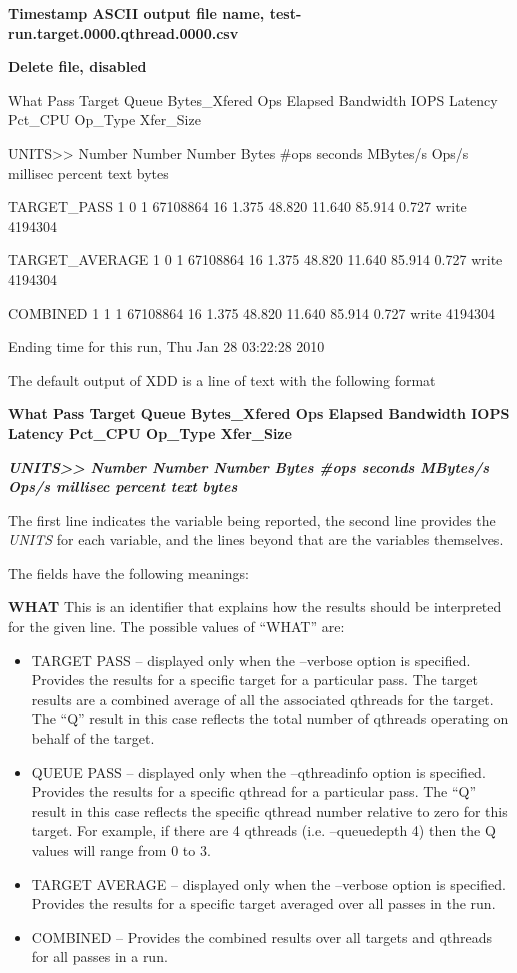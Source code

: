 \textbf{Timestamp ASCII output file name, test-run.target.0000.qthread.0000.csv}

\textbf{Delete file, disabled}

What Pass Target Queue Bytes\_Xfered Ops Elapsed Bandwidth IOPS Latency Pct\_CPU Op\_Type Xfer\_Size

UNITS\textgreater\textgreater{} Number Number Number Bytes \#ops seconds MBytes/s Ops/s millisec percent text bytes

TARGET\_PASS 1 0 1 67108864 16 1.375 48.820 11.640 85.914 0.727 write 4194304

TARGET\_AVERAGE 1 0 1 67108864 16 1.375 48.820 11.640 85.914 0.727 write 4194304

COMBINED 1 1 1 67108864 16 1.375 48.820 11.640 85.914 0.727 write 4194304

Ending time for this run, Thu Jan 28 03:22:28 2010

The default output of XDD is a line of text with the following format

\textbf{What Pass Target Queue Bytes\_Xfered Ops Elapsed Bandwidth IOPS Latency Pct\_CPU Op\_Type Xfer\_Size}

\textbf{\emph{UNITS\textgreater\textgreater{} Number Number Number Bytes \#ops seconds MBytes/s Ops/s millisec percent text} \emph{bytes}}

The first line indicates the variable being reported, the second line provides the \emph{UNITS} for each variable, and the lines beyond that are the variables themselves.

The fields have the following meanings:

\textbf{WHAT} This is an identifier that explains how the results should be interpreted for the given line. The possible values of ``WHAT'' are:

\begin{itemize}
\item
  TARGET PASS -- displayed only when the --verbose option is specified. Provides the results for a specific target for a particular pass. The target results are a combined average of all the associated qthreads for the target. The ``Q'' result in this case reflects the total number of qthreads operating on behalf of the target.
\item
  QUEUE PASS -- displayed only when the --qthreadinfo option is specified. Provides the results for a specific qthread for a particular pass. The ``Q'' result in this case reflects the specific qthread number relative to zero for this target. For example, if there are 4 qthreads (i.e. --queuedepth 4) then the Q values will range from 0 to 3.
\item
  TARGET AVERAGE -- displayed only when the --verbose option is specified. Provides the results for a specific target averaged over all passes in the run.
\item
  COMBINED -- Provides the combined results over all targets and qthreads for all passes in a run.
\end{itemize}

